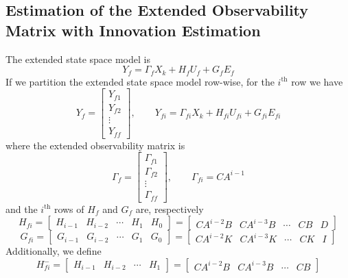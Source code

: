 \subsection{Estimation of the Extended Observability Matrix with Innovation Estimation}
The extended state space model is
\begin{equation}\label{eq:3_extended_state_space_future_cl}
Y_f = \Gamma_f X_k + H_f U_f + G_f E_f
\end{equation}
If we partition the extended state space model row-wise, for the $i^{\mbox{th}}$ row we have
\begin{equation}\label{eq:3_extended_state_space_row}
Y_f = \begin{bmatrix}
Y_{f1}\\ Y_{f2}\\ \vdots \\ Y_{ff}
\end{bmatrix}, \qquad 
Y_{fi} = \Gamma_{fi} X_k + H_{fi} U_{fi} + G_{fi} E_{fi}
\end{equation}
where the extended observability matrix is
\begin{equation*}
\Gamma_f = \begin{bmatrix}
\Gamma_{f1}\\ \Gamma_{f2}\\ \vdots \\ \Gamma_{ff}
\end{bmatrix}, \qquad \Gamma_{fi} = CA^{i-1}
\end{equation*}
and the $i^{\mbox{th}}$ rows of $H_f$ and $G_f$ are, respectively
\begin{equation*}
H_{fi} = \begin{bmatrix} H_{i-1} & H_{i-2} & \cdots & H_1 & H_0\end{bmatrix} = \begin{bmatrix} CA^{i-2}B & CA^{i-3}B & \cdots & CB & D\end{bmatrix} 
\end{equation*}
\begin{equation*}
G_{fi} = \begin{bmatrix} G_{i-1} & G_{i-2} & \cdots & G_1 & G_0\end{bmatrix} = \begin{bmatrix} CA^{i-2}K & CA^{i-3}K & \cdots & CK & I\end{bmatrix}
\end{equation*}
Additionally, we define 
\begin{equation*}
H_{fi}^{-} = \begin{bmatrix} H_{i-1} & H_{i-2} & \cdots & H_1\end{bmatrix} = \begin{bmatrix} CA^{i-2}B & CA^{i-3}B & \cdots & CB\end{bmatrix}
\end{equation*}
